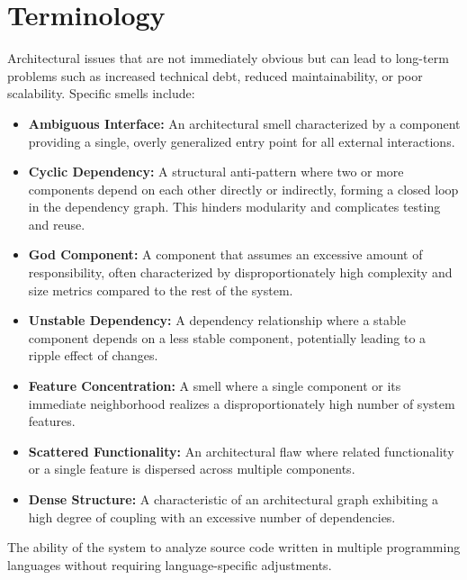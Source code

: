 \section{Terminology}
\label{section:terminology}

\begin{description}[style=multiline, leftmargin=3cm, font=\normalfont, itemsep=1em]
    \item[\textbf{Architecture Smells}] Architectural issues that are not immediately obvious but can lead to long-term problems such as increased technical debt, reduced maintainability, or poor scalability. Specific smells include:
    \begin{itemize}
        \item \textbf{Ambiguous Interface:} An architectural smell characterized by a component providing a single, overly generalized entry point for all external interactions.
        \item \textbf{Cyclic Dependency:} A structural anti-pattern where two or more components depend on each other directly or indirectly, forming a closed loop in the dependency graph. This hinders modularity and complicates testing and reuse.
        \item \textbf{God Component:} A component that assumes an excessive amount of responsibility, often characterized by disproportionately high complexity and size metrics compared to the rest of the system.
        \item \textbf{Unstable Dependency:} A dependency relationship where a stable component depends on a less stable component, potentially leading to a ripple effect of changes.
        \item \textbf{Feature Concentration:} A smell where a single component or its immediate neighborhood realizes a disproportionately high number of system features.
        \item \textbf{Scattered Functionality:} An architectural flaw where related functionality or a single feature is dispersed across multiple components.
        \item \textbf{Dense Structure:} A characteristic of an architectural graph exhibiting a high degree of coupling with an excessive number of dependencies.
    \end{itemize}

    \item[\textbf{Language Independence}] The ability of the system to analyze source code written in multiple programming languages without requiring language-specific adjustments.


\end{description}
